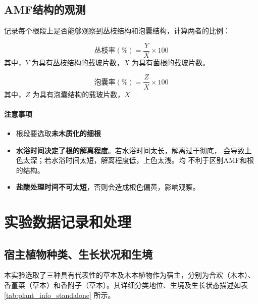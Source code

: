 \documentclass[10.5pt]{config}
\begin{document}
\subsection{AMF结构的观测}
记录每个根段上是否能够观察到丛枝结构和泡囊结构，计算两者的比例：

\begin{equation}
    \text{丛枝率}(\%) = \frac{Y}{X} \times 100
    \label{eq:arbuscule}
\end{equation}
其中，$Y$ 为具有丛枝结构的载玻片数，$X$ 为具有菌根的载玻片数。

\begin{equation}
    \text{泡囊率}(\%) = \frac{Z}{X} \times 100
    \label{eq:vesicle}
\end{equation}
其中，$Z$ 为具有泡囊结构的载玻片数，$X$ 

\paragraph{注意事项}

\begin{itemize}
    \item 根段要选取\textbf{未木质化的细根}
    \item \textbf{水浴时间决定了根的解离程度}。若水浴时间太长，解离过于彻底，
会导致上色太深；若水浴时间太短，解离程度低，上色太浅。均
不利于区别AMF和根的结构。
    \item \textbf{盐酸处理时间不可太短}，否则会造成根色偏黄，影响观察。
\end{itemize}

\newpage

\section{实验数据记录和处理}

\subsection{宿主植物种类、生长状况和生境}

本实验选取了三种具有代表性的草本及木本植物作为宿主，分别为合欢（木本）、香堇菜（草本）和香附子（草本）。其详细分类地位、生境及生长状态描述如表 \ref{tab:plant_info_standalone} 所示。
\end{document}
